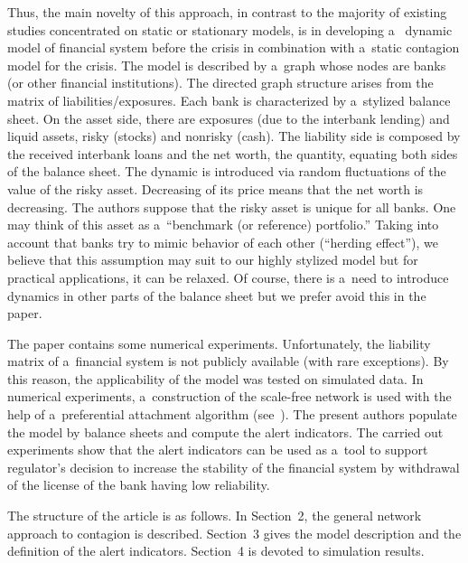\begin{multicols}{2}
Thus, the main novelty of this approach, in contrast to the majority of existing  
studies  concentrated on  static or stationary models, is in developing  a~
dynamic model of financial system before the crisis in combination with a~static 
contagion model for the crisis.  
The model is described by a~graph whose nodes are banks (or other 
financial institutions). The directed graph structure  arises from the matrix of 
liabilities/exposures. Each bank is characterized by a~stylized balance sheet. 
On the asset side, 
there are exposures (due to the  interbank lending) and liquid assets, risky 
(stocks) and nonrisky (cash).   
 The liability side is composed by the received interbank loans and the net 
worth, the quantity, equating both sides of the balance sheet.  The dynamic is 
introduced via random fluctuations of the value of the risky asset. Decreasing 
of its price means that the net worth is decreasing. The authors suppose that the risky 
asset is unique for all banks. One may think of this asset as a~``benchmark (or 
reference) portfolio.''  Taking into account that banks try to mimic behavior of 
each other (``herding effect''), we believe that this assumption may suit to our 
highly stylized model but for  practical applications, it can be relaxed.  Of 
course,  there is a~need to introduce dynamics in other parts of the balance 
sheet  but we prefer avoid this in the paper. 
 

The paper contains some numerical experiments. Unfortunately,  the liability 
matrix of a~financial system is not publicly available (with rare exceptions). 
By this reason, the  applicability of the model was tested on simulated data. In 
numerical experiments,  a~construction of the scale-free network is used with the
help of 
a~preferential attachment algorithm (see~\cite{BarAlb}).   
The present authors populate the model by balance sheets and compute the alert indicators.   
The carried out experiments show that the alert indicators can be used as a~tool to support 
regulator's decision to increase the stability of the financial system by 
withdrawal of the license of the 
bank  having low re\-liability.  
{

}



The structure of the article is as follows. In Section~2, 
the general network approach to contagion is described. 
Section~3  gives the model description and the definition of the alert 
indicators. 
Section~4 is devoted to simulation results.  
 


\end{multicols}
